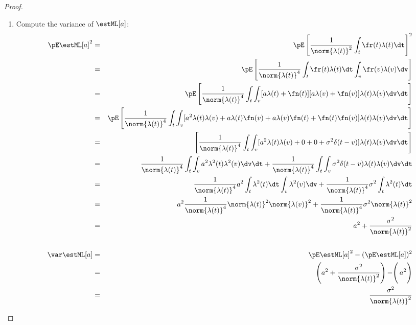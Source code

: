 \begin{proof}
\begin{enumerate}
\item Compute the variance of $\estML[a]$:
\begin{eqnarray*}
  \pE \estML[a]^2
    &=& \pE \left[ \frac{1}{\norm{\lambda(t)}^2} \int_t \fr(t)\lambda(t) \dt\right]^2
  \\&=& \pE \left[  \frac{1}{\norm{\lambda(t)}^4} 
        \int_t \fr(t)\lambda(t) \dt \int_v \fr(v)\lambda(v) \dv
        \right]
  \\&=& \pE \left[  \frac{1}{\norm{\lambda(t)}^4} 
        \int_t \int_v [a\lambda(t) + \fn(t)][a\lambda(v) + \fn(v)]
        \lambda(t) \lambda(v) 
        \dv\dt \right]
  \\&=& \pE \left[  \frac{1}{\norm{\lambda(t)}^4} 
        \int_t \int_v 
        [a^2\lambda(t)\lambda(v) + a\lambda(t)\fn(v) + a\lambda(v)\fn(t) + \fn(t)\fn(v)]
        \lambda(t) \lambda(v) 
        \dv\dt \right]
  \\&=& \left[  \frac{1}{\norm{\lambda(t)}^4} 
        \int_t \int_v 
        [a^2\lambda(t)\lambda(v) + 0 + 0 + \sigma^2\delta(t-v)]
        \lambda(t) \lambda(v) 
        \dv\dt \right]
  \\&=& \frac{1}{\norm{\lambda(t)}^4} 
        \int_t \int_v a^2\lambda^2(t)\lambda^2(v) \dv\dt +
        \frac{1}{\norm{\lambda(t)}^4} 
        \int_t \int_v \sigma^2\delta(t-v) \lambda(t) \lambda(v) \dv\dt 
  \\&=& \frac{1}{\norm{\lambda(t)}^4} 
        a^2 \int_t \lambda^2(t) \dt \int_v \lambda^2(v) \dv +
        \frac{1}{\norm{\lambda(t)}^4} 
        \sigma^2\int_t \lambda^2(t) \dt 
  \\&=& a^2 \frac{1}{\norm{\lambda(t)}^4} 
        \norm{\lambda(t)}^2 \norm{\lambda(v)}^2 +
        \frac{1}{\norm{\lambda(t)}^4} 
        \sigma^2 \norm{\lambda(t)}^2
  \\&=& a^2 + \frac{\sigma^2}{\norm{\lambda(t)}^2} 
\\ 
\\
  \var\estML[a] 
    &=& \pE \estML[a]^2 - (\pE \estML[a])^2 
  \\&=& \left.\left.\left(a^2 + \frac{\sigma^2}{\norm{\lambda(t)}^2}\right) - \right( a^2 \right)
  \\&=& \frac{\sigma^2}{\norm{\lambda(t)}^2}
\end{eqnarray*}


\end{enumerate}
\end{proof}
